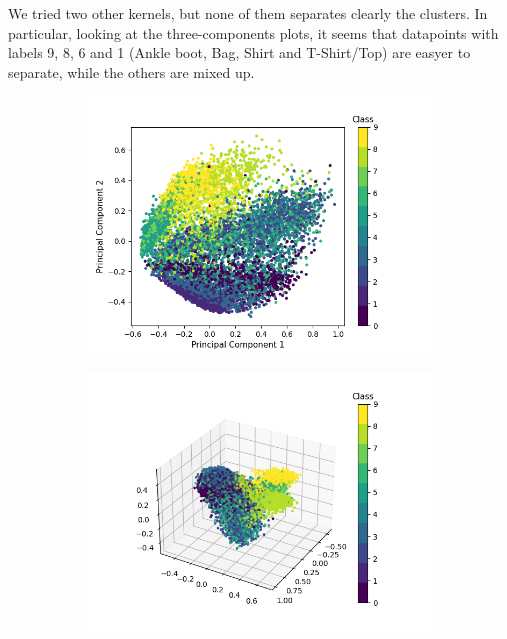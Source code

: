 \documentclass[12pt]{article}
\begin{document}
We tried two other kernels, but none of them separates clearly the clusters. In particular, looking at the three-components plots,  it seems that datapoints with labels 9, 8, 6 and 1 (Ankle boot, Bag, Shirt and T-Shirt/Top) are easyer to separate, while the others are mixed up.
\begin{figure}[h]
	\begin{subfigure}{0.5\textwidth}
		\includegraphics[width=0.4\textheight]{pca_poly_2comps.png}
		\caption{}
		\label{fig:pca_poly_2comps}
	\end{subfigure}
	\begin{subfigure}{0.5\textwidth}
		\includegraphics[width=0.4\textheight]{pca_poly_3comps.png}

\end{subfigure}
\end{figure}
\end{document}
